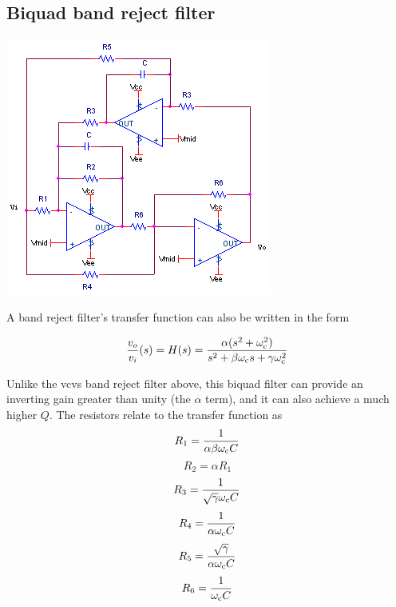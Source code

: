 \subsection{Biquad band reject filter}
\begin{center}
	\includegraphics{schematics/biquad_bandreject.PNG}
\end{center}
A band reject filter's transfer function can also be written in the form 

\textcolor{red}{
\begin{equation}
\frac{\vout}{\vin}(s) = \Hs = \frac{\alpha (s^2 + \wcutoff^2)}{s^2 + \beta \wcutoff s + \gamma \wcutoff^2}
\label{eq:biquad_bandreject}
\end{equation}
}

Unlike the \ac{vcvs} band reject filter above, this biquad filter can provide an inverting gain greater than unity (the $\alpha$ term), and it can also achieve a much higher $Q$.
The resistors relate to the transfer function as \autocite[146-148]{op-amp-circuits-johnson}
\begin{equation}
R_1 = \frac{1}{\alpha \beta \omega_\mathrm{c} C}
\end{equation}
\begin{equation}
R_2 = \alpha R_1
\end{equation}
\begin{equation}
R_3 = \frac{1}{\sqrt{\gamma} \omega_\mathrm{c} C}
\end{equation}
\begin{equation}
R_4 = \frac{1}{\alpha \omega_\mathrm{c} C}
\end{equation}
\begin{equation}
R_5 = \frac{\sqrt{\gamma}}{\alpha \omega_\mathrm{c} C}
\end{equation}
\begin{equation}
R_6 = \frac{1}{\omega_\mathrm{c} C}
\end{equation}


